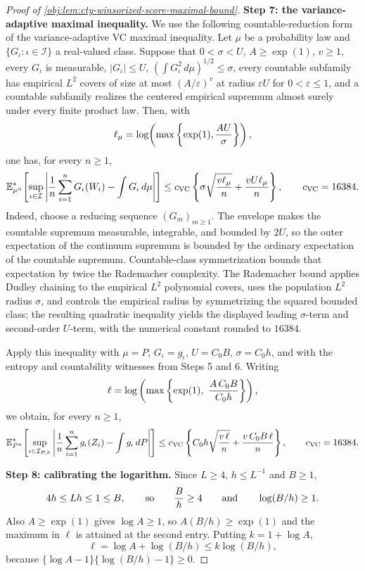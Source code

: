 \begin{proof}[Proof of \cref{obj:lem:cty-winsorized-score-maximal-bound}]
\textbf{Step 7: the variance-adaptive maximal inequality.}  We use the following countable-reduction form of the variance-adaptive VC maximal inequality.  Let \(\mu\) be a probability law and \(\{G_\iota:\iota\in\mathcal I\}\) a real-valued class.  Suppose that \(0<\sigma<U\), \(A\geq\exp(1)\), \(v\geq1\), every \(G_\iota\) is measurable, \(|G_\iota|\leq U\), \((\int G_\iota^2\,d\mu)^{1/2}\leq\sigma\), every countable subfamily has empirical \(L^2\) covers of size at most \((A/\varepsilon)^v\) at radius \(\varepsilon U\) for \(0<\varepsilon\leq1\), and a countable subfamily realizes the centered empirical supremum almost surely under every finite product law.  Then, with
\[
\ell_{\mu}=\log\!\left(\max\left\{\exp(1),{AU\over\sigma}\right\}\right),
\]
one has, for every \(n\geq1\),
\[
\mathbb E_{\mu^n}^{*}\!\left[
\sup_{\iota\in\mathcal I}
\left|{1\over n}\sum_{i=1}^n G_\iota(W_i)-\int G_\iota\,d\mu\right|
\right]
\leq
c_{\mathrm{VC}}\left\{
\sigma\sqrt{{v\ell_{\mu}\over n}}
+{vU\ell_{\mu}\over n}
\right\},
\qquad c_{\mathrm{VC}}=16384 .
\]
Indeed, choose a reducing sequence \((G_m)_{m\geq1}\).  The envelope makes the countable supremum measurable, integrable, and bounded by \(2U\), so the outer expectation of the continuum supremum is bounded by the ordinary expectation of the countable supremum.  Countable-class symmetrization bounds that expectation by twice the Rademacher complexity.  The Rademacher bound applies Dudley chaining to the empirical \(L^2\) polynomial covers, uses the population \(L^2\) radius \(\sigma\), and controls the empirical radius by symmetrizing the squared bounded class; the resulting quadratic inequality yields the displayed leading \(\sigma\)-term and second-order \(U\)-term, with the numerical constant rounded to \(16384\).

Apply this inequality with \(\mu=P\), \(G_\iota=g_\iota\), \(U=C_0B\), \(\sigma=C_0h\), and with the entropy and countability witnesses from Steps 5 and 6.  Writing
\[
\ell=
\log\left(\max\left\{\exp(1),\ {A\,C_0B\over C_0h}\right\}\right),
\]
we obtain, for every \(n\geq1\),
\[
\mathbb E_{P^n}^{*}\!\left[
\sup_{\iota\in\mathcal I_{P,h}}
\left|
{1\over n}\sum_{i=1}^n g_\iota(Z_i)-\int g_\iota\,dP
\right|
\right]
\leq
c_{\mathrm{VC}}
\left\{
C_0h\sqrt{{v\,\ell\over n}}
+
{v\,C_0B\,\ell\over n}
\right\},
\qquad
c_{\mathrm{VC}}=16384 .
\]

\textbf{Step 8: calibrating the logarithm.}  Since \(L\geq4\), \(h\leq L^{-1}\) and \(B\geq1\),
\[
4h\leq Lh\leq1\leq B,
\qquad\text{so}\qquad
{B\over h}\geq4
\qquad\text{and}\qquad
\log(B/h)\geq1 .
\]
Also \(A\geq\exp(1)\) gives \(\log A\geq1\), so \(A(B/h)\geq\exp(1)\) and the maximum in \(\ell\) is attained at the second entry.  Putting \(k=1+\log A\),
\[
\ell=\log A+\log(B/h)\leq k\log(B/h),
\]
because \(\{\log A-1\}\{\log(B/h)-1\}\geq0\).


\end{proof}
